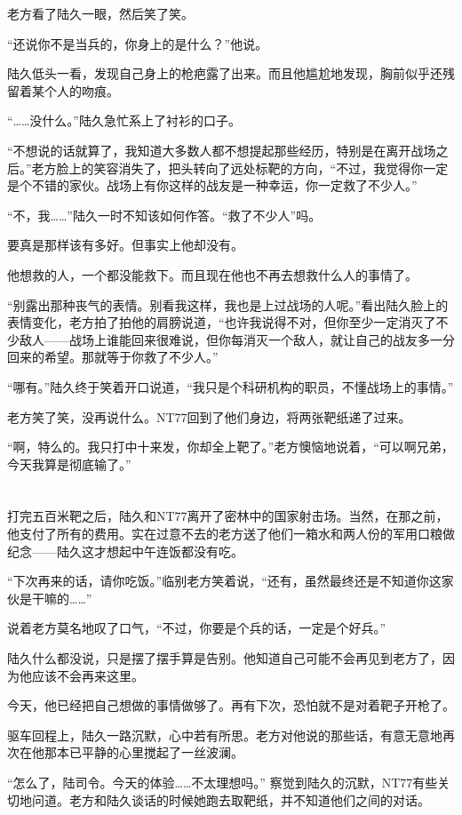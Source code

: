 老方看了陆久一眼，然后笑了笑。

“还说你不是当兵的，你身上的是什么？”他说。

陆久低头一看，发现自己身上的枪疤露了出来。而且他尴尬地发现，胸前似乎还残留着某个人的吻痕。

“……没什么。”陆久急忙系上了衬衫的口子。

“不想说的话就算了，我知道大多数人都不想提起那些经历，特别是在离开战场之后。”老方脸上的笑容消失了，把头转向了远处标靶的方向，“不过，我觉得你一定是个不错的家伙。战场上有你这样的战友是一种幸运，你一定救了不少人。”

“不，我……”陆久一时不知该如何作答。“救了不少人”吗。

要真是那样该有多好。但事实上他却没有。

他想救的人，一个都没能救下。而且现在他也不再去想救什么人的事情了。

“别露出那种丧气的表情。别看我这样，我也是上过战场的人呢。”看出陆久脸上的表情变化，老方拍了拍他的肩膀说道，“也许我说得不对，但你至少一定消灭了不少敌人——战场上谁能回来很难说，但你每消灭一个敌人，就让自己的战友多一分回来的希望。那就等于你救了不少人。”

“哪有。”陆久终于笑着开口说道，“我只是个科研机构的职员，不懂战场上的事情。”

老方笑了笑，没再说什么。NT77回到了他们身边，将两张靶纸递了过来。

“啊，特么的。我只打中十来发，你却全上靶了。”老方懊恼地说着，“可以啊兄弟，今天我算是彻底输了。”\section*{}

打完五百米靶之后，陆久和NT77离开了密林中的国家射击场。当然，在那之前，他支付了所有的费用。实在过意不去的老方送了他们一箱水和两人份的军用口粮做纪念——陆久这才想起中午连饭都没有吃。

“下次再来的话，请你吃饭。”临别老方笑着说，“还有，虽然最终还是不知道你这家伙是干嘛的……”

说着老方莫名地叹了口气，“不过，你要是个兵的话，一定是个好兵。”

陆久什么都没说，只是摆了摆手算是告别。他知道自己可能不会再见到老方了，因为他应该不会再来这里。

今天，他已经把自己想做的事情做够了。再有下次，恐怕就不是对着靶子开枪了。

驱车回程上，陆久一路沉默，心中若有所思。老方对他说的那些话，有意无意地再次在他那本已平静的心里搅起了一丝波澜。

“怎么了，陆司令。今天的体验……不太理想吗。” 察觉到陆久的沉默，NT77有些关切地问道。老方和陆久谈话的时候她跑去取靶纸，并不知道他们之间的对话。

